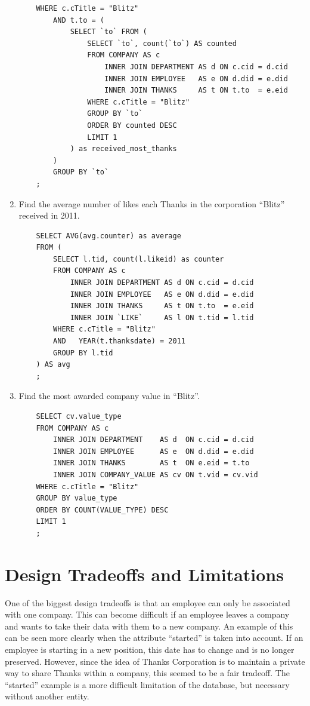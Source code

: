 \documentclass[11pt]{report}
\begin{document}
\begin{enumerate}
\begin{verbatim}
    WHERE c.cTitle = "Blitz"
        AND t.to = (
            SELECT `to` FROM (
                SELECT `to`, count(`to`) AS counted
                FROM COMPANY AS c
                    INNER JOIN DEPARTMENT AS d ON c.cid = d.cid
                    INNER JOIN EMPLOYEE   AS e ON d.did = e.did
                    INNER JOIN THANKS     AS t ON t.to  = e.eid
                WHERE c.cTitle = "Blitz"
                GROUP BY `to`
                ORDER BY counted DESC
                LIMIT 1
            ) as received_most_thanks
        )
        GROUP BY `to`
    ;
    \end{verbatim}
    \item Find the average number of likes each Thanks in the corporation ``Blitz'' received in 2011.
    \begin{verbatim}
    SELECT AVG(avg.counter) as average
    FROM (
        SELECT l.tid, count(l.likeid) as counter
        FROM COMPANY AS c
            INNER JOIN DEPARTMENT AS d ON c.cid = d.cid
            INNER JOIN EMPLOYEE   AS e ON d.did = e.did
            INNER JOIN THANKS     AS t ON t.to  = e.eid
            INNER JOIN `LIKE`     AS l ON t.tid = l.tid
        WHERE c.cTitle = "Blitz"
        AND   YEAR(t.thanksdate) = 2011
        GROUP BY l.tid
    ) AS avg
    ;
    \end{verbatim}
    \item Find the most awarded company value in ``Blitz''.
    \begin{verbatim}
    SELECT cv.value_type
    FROM COMPANY AS c
        INNER JOIN DEPARTMENT    AS d  ON c.cid = d.cid
        INNER JOIN EMPLOYEE      AS e  ON d.did = e.did
        INNER JOIN THANKS        AS t  ON e.eid = t.to
        INNER JOIN COMPANY_VALUE AS cv ON t.vid = cv.vid
    WHERE c.cTitle = "Blitz"
    GROUP BY value_type
    ORDER BY COUNT(VALUE_TYPE) DESC
    LIMIT 1
    ;
    \end{verbatim}
\end{enumerate}
\section{Design Tradeoffs and Limitations}

One of the biggest design tradeoffs is that an employee can only be associated with one company. This can become difficult if an employee leaves a company and wants to take their data with them to a new company. An example of this can be seen more clearly when the attribute ``started'' is taken into account. If an employee is starting in a new position, this date has to change and is no longer preserved. However, since the idea of Thanks Corporation is to maintain a private way to share Thanks within a company, this seemed to be a fair tradeoff. The ``started'' example is a more difficult limitation of the database, but necessary without another entity. \\
\end{document}

